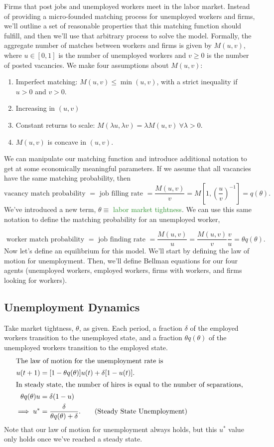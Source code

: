 \documentclass[11pt]{article}
\newcommand{\gr}{\textcolor{ForestGreen}}
\begin{document}
Firms that post jobs and unemployed workers meet in the labor market. Instead of providing a micro-founded matching process for unemployed workers and firms, we'll outline a set of reasonable properties that this matching function should fulfill, and then we'll use that arbitrary process to solve the model. Formally, the aggregate number of matches between workers and firms is given by \(M(u, v)\), where \(u \in [0, 1]\) is the number of unemployed workers and \(v \ge 0\) is the number of posted vacancies. We make four assumptions about \(M(u, v)\):
\begin{enumerate}
\item Imperfect matching: $M(u, v) \le \min (u, v)$, with a strict inequality if $u > 0$ and $v > 0$.
\item Increasing in $(u, v)$
\item Constant returns to scale: $M(\lambda u, \lambda v) = \lambda M(u, v) \ \forall \lambda > 0$.
\item $M(u, v)$ is concave in $(u, v)$.
\end{enumerate}
We can manipulate our matching function and introduce additional notation to get at some economically meaningful parameters. If we assume that all vacancies have the same matching probability, then
\[
\text{vacancy match probability } = \text{ job filling rate } = \frac{M(u, v)}{v} = M \left[1, \left(\frac{u}{v}\right)^{-1}\right] = q(\theta).
\]
We've introduced a new term, \(\theta \equiv\) \gr{labor market tightness}. We can use this same notation to define the matching probability for an unemployed worker,

\[
\text{ worker match probability } = \text{ job finding rate } = \frac{M(u, v)}{u} = \frac{M(u, v)}{v} \frac{v}{u} = \theta q(\theta).
\]
Now let's define an equilibrium for this model. We'll start by defining the law of motion for unemployment. Then, we'll define Bellman equations for our four agents (unemployed workers, employed workers, firms with workers, and firms looking for workers). 

\subsection{Unemployment Dynamics}
\label{sec:org3fed987}
Take market tightness, \(\theta\), as given. Each period, a fraction \(\delta\) of the employed workers transition to the unemployed state, and a fraction \(\theta q(\theta)\) of the unemployed workers transition to the employed state. 
\begin{align*} 
\intertext{The law of motion for the unemployment rate is}
u(t + 1) &= [1 - \theta q(\theta)] u(t) + \delta [1 - u(t)].\\
\intertext{In steady state, the number of hires is equal to the number of separations,}
\theta q(\theta) u &= \delta (1 - u)\\
\implies u^\ast &= \frac{\delta}{\theta q(\theta) + \delta}. \tag{Steady State Unemployment}
\end{align*} 
Note that our law of motion for unemployment always holds, but this \(u^\ast\) value only holds once we've reached a steady state.
\end{document}
